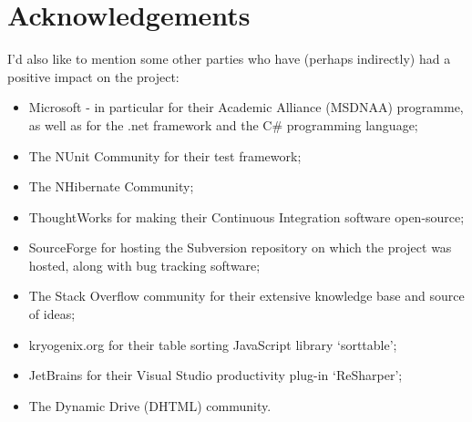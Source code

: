 \documentclass{l4proj}
\begin{document}
\section*{Acknowledgements}
I'd also like to mention some other parties who have (perhaps indirectly) had a positive impact on the project: \
\begin{itemize} 
\item Microsoft - in particular for their Academic Alliance (MSDNAA) programme, as well as for the .\gls{net} framework and the C\# programming language;
\item The NUnit Community for their test framework;
\item The NHibernate Community;
\item ThoughtWorks for making their Continuous Integration software open-source;
\item SourceForge for hosting the Subversion repository on which the project was hosted, along with bug tracking software;
\item The Stack Overflow community for their extensive knowledge base and source of ideas;
\item kryogenix.org for their table sorting JavaScript library `sorttable';
\item JetBrains for their Visual Studio productivity plug-in `ReSharper';
\item The Dynamic Drive (DHTML) community.
\end{itemize}

\educationalconsent
%









\tableofcontents










\appendix

\printglossaries



\end{document}
